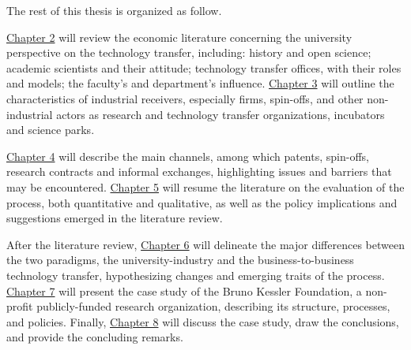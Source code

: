 The rest of this thesis is organized as follow.

\hyperref[Chapter2]{Chapter 2} will review the economic literature concerning the university perspective on the technology transfer, including: history and open science; academic scientists and their attitude; technology transfer offices, with their roles and models; the faculty's and department's influence. \hyperref[Chapter3]{Chapter 3} will outline the characteristics of industrial receivers, especially firms, spin-offs, and other non-industrial actors as research and technology transfer organizations, incubators and science parks. 

\hyperref[Chapter4]{Chapter 4} will describe the main channels, among which patents, spin-offs, research contracts and informal exchanges, highlighting issues and barriers that may be encountered. \hyperref[Chapter5]{Chapter 5} will resume the literature on the evaluation of the process, both quantitative and qualitative, as well as the policy implications and suggestions emerged in the literature review.

After the literature review, \hyperref[Chapter6]{Chapter 6} will delineate the major differences between the two paradigms, the university-industry and the business-to-business technology transfer, hypothesizing changes and emerging traits of the process. \hyperref[Chapter7]{Chapter 7} will present the case study of the Bruno Kessler Foundation, a non-profit publicly-funded research organization, describing its structure, processes, and policies. Finally, \hyperref[Chapter8]{Chapter 8} will discuss the case study, draw the conclusions, and provide the concluding remarks. 